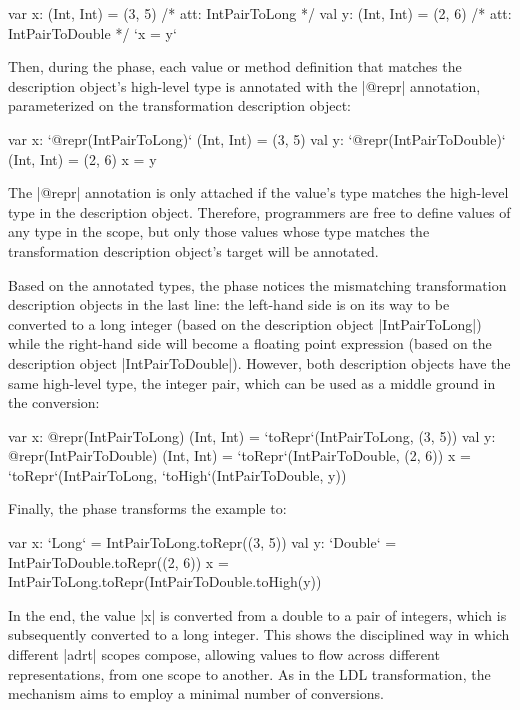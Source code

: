 \begin{lstlisting-nobreak}
var x: (Int, Int) = (3, 5) /* att: IntPairToLong */
val y: (Int, Int) = (2, 6) /* att: IntPairToDouble */
`x = y`
\end{lstlisting-nobreak}

Then, during the \inject{} phase, each value or method definition that matches the description object's high-level type is annotated with the |@repr| annotation, parameterized on the transformation description object:

\begin{lstlisting-nobreak}
var x: `@repr(IntPairToLong)` (Int, Int) = (3, 5)
val y: `@repr(IntPairToDouble)` (Int, Int) = (2, 6)
x = y
\end{lstlisting-nobreak}

The |@repr| annotation is only attached if the value's type matches the high-level type in the description object. Therefore, programmers are free to define values of any type in the scope, but only those values whose type matches the transformation description object's target will be annotated.

Based on the annotated types, the \coerce{} phase notices the mismatching transformation description objects in the last line: the left-hand side is on its way to be converted to a long integer (based on the description object |IntPairToLong|) while the right-hand side will become a floating point expression (based on the description object |IntPairToDouble|). However, both description objects have the same high-level type, the integer pair, which can be used as a middle ground in the conversion:

\begin{lstlisting-nobreak}
var x: @repr(IntPairToLong) (Int, Int) = `toRepr`(IntPairToLong, (3, 5))
val y: @repr(IntPairToDouble) (Int, Int) = `toRepr`(IntPairToDouble, (2, 6))
x = `toRepr`(IntPairToLong, `toHigh`(IntPairToDouble, y))
\end{lstlisting-nobreak}

Finally, the \commit{} phase transforms the example to:

\begin{lstlisting-nobreak}
var x: `Long` = IntPairToLong.toRepr((3, 5))
val y: `Double` = IntPairToDouble.toRepr((2, 6))
x = IntPairToLong.toRepr(IntPairToDouble.toHigh(y))
\end{lstlisting-nobreak}

In the end, the value |x| is converted from a double to a pair of integers, which is subsequently converted to a long integer. This shows the disciplined way in which different |adrt| scopes compose, allowing values to flow across different representations, from one scope to another. As in the LDL transformation, the mechanism aims to employ a minimal number of conversions.

